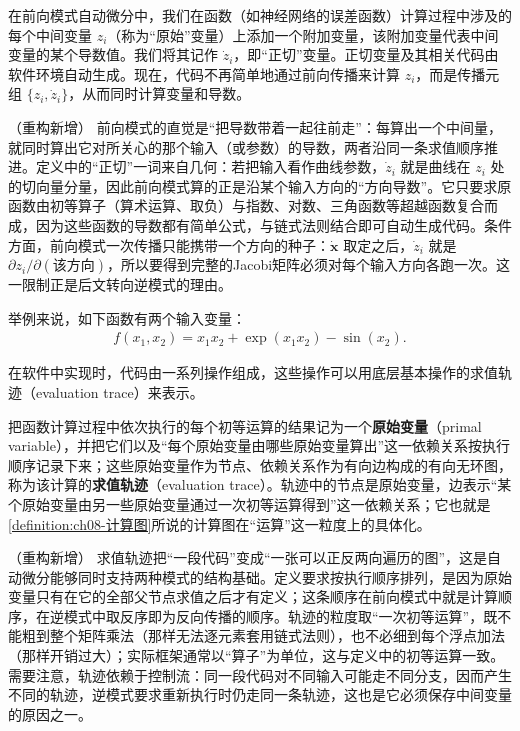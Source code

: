 \documentclass[../../main.tex]{subfiles}
\begin{document}
\begin{definition}[前向模式自动微分]\label{definition:ch08-前向模式}
在前向模式自动微分中，我们在函数（如神经网络的误差函数）计算过程中涉及的每个中间变量 $z_i$（称为“原始”变量）上添加一个附加变量，该附加变量代表中间变量的某个导数值。我们将其记作 $\dot{z}_i$，即“正切”变量。正切变量及其相关代码由软件环境自动生成。现在，代码不再简单地通过前向传播来计算 $z_i$，而是传播元组 $\{z_i,\dot{z}_i\}$，从而同时计算变量和导数。
\end{definition}

\begin{remark}（重构新增）
前向模式的直觉是“把导数带着一起往前走”：每算出一个中间量，就同时算出它对所关心的那个输入（或参数）的导数，两者沿同一条求值顺序推进。定义中的“正切”一词来自几何：若把输入看作曲线参数，$\dot{z}_i$ 就是曲线在 $z_i$ 处的切向量分量，因此前向模式算的正是沿某个输入方向的“方向导数”。它只要求原函数由初等算子（算术运算、取负）与指数、对数、三角函数等超越函数复合而成，因为这些函数的导数都有简单公式，与链式法则结合即可自动生成代码。条件方面，前向模式一次传播只能携带一个方向的种子：$\dot{\mathbf{x}}$ 取定之后，$\dot{z}_i$ 就是 $\partial z_i/\partial(\text{该方向})$，所以要得到完整的Jacobi矩阵必须对每个输入方向各跑一次。这一限制正是后文转向逆模式的理由。
\end{remark}

举例来说，如下函数有两个输入变量：
\begin{align}
f(x_1,x_2)=x_1x_2+\exp(x_1x_2)-\sin(x_2).
\label{align:ch08-示例函数}
\end{align}

在软件中实现时，代码由一系列操作组成，这些操作可以用底层基本操作的求值轨迹（evaluation trace）来表示。

\begin{definition}[求值轨迹]\label{definition:ch08-求值轨迹}
把函数计算过程中依次执行的每个初等运算的结果记为一个\textbf{原始变量}（primal variable），并把它们以及“每个原始变量由哪些原始变量算出”这一依赖关系按执行顺序记录下来；这些原始变量作为节点、依赖关系作为有向边构成的有向无环图，称为该计算的\textbf{求值轨迹}（evaluation trace）。轨迹中的节点是原始变量，边表示“某个原始变量由另一些原始变量通过一次初等运算得到”这一依赖关系；它也就是\cref{definition:ch08-计算图}所说的计算图在“运算”这一粒度上的具体化。
\end{definition}

\begin{remark}（重构新增）
求值轨迹把“一段代码”变成“一张可以正反两向遍历的图”，这是自动微分能够同时支持两种模式的结构基础。定义要求按执行顺序排列，是因为原始变量只有在它的全部父节点求值之后才有定义；这条顺序在前向模式中就是计算顺序，在逆模式中取反序即为反向传播的顺序。轨迹的粒度取“一次初等运算”，既不能粗到整个矩阵乘法（那样无法逐元素套用链式法则），也不必细到每个浮点加法（那样开销过大）；实际框架通常以“算子”为单位，这与定义中的初等运算一致。需要注意，轨迹依赖于控制流：同一段代码对不同输入可能走不同分支，因而产生不同的轨迹，逆模式要求重新执行时仍走同一条轨迹，这也是它必须保存中间变量的原因之一。
\end{remark}
\end{document}
